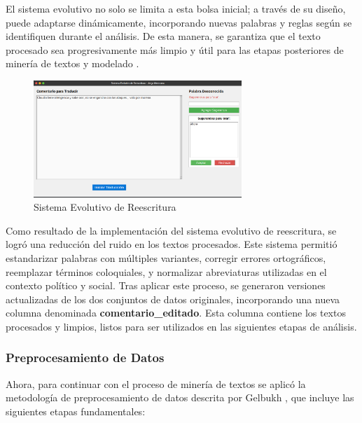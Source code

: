\documentclass[10pt, a4paper]{article}
\begin{document}
	El sistema evolutivo no solo se limita a esta bolsa inicial; a través de su diseño, puede adaptarse dinámicamente, incorporando nuevas palabras y reglas según se identifiquen durante el análisis. De esta manera, se garantiza que el texto procesado sea progresivamente más limpio y útil para las etapas posteriores de minería de textos y modelado \parencite{galindo1991sistemas}.
	
	\begin{figure}[h!] %
		\centering
		\includegraphics[width=0.7\textwidth]{evolutivo.png} %
		\caption{Sistema Evolutivo de Reescritura} %
		\label{fig:evolutivo} %
	\end{figure}
	
	Como resultado de la implementación del sistema evolutivo de reescritura, se logró una reducción del ruido en los textos procesados. Este sistema permitió estandarizar palabras con múltiples variantes, corregir errores ortográficos, reemplazar términos coloquiales, y normalizar abreviaturas utilizadas en el contexto político y social. Tras aplicar este proceso, se generaron versiones actualizadas de los dos conjuntos de datos originales, incorporando una nueva columna denominada \textbf{comentario\_editado}. Esta columna contiene los textos procesados y limpios, listos para ser utilizados en las siguientes etapas de análisis.
	
	\subsubsection{Preprocesamiento de Datos}
	
	Ahora, para continuar con el proceso de minería de textos se aplicó la metodología de preprocesamiento de datos descrita por Gelbukh \parencite{gelbukh2003procesamiento}, que incluye las siguientes etapas fundamentales:
	
\end{document}

